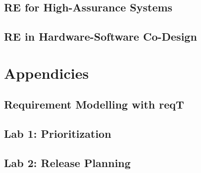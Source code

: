 \documentclass{reqengbook}
\begin{document}
\chapter{RE for High-Assurance Systems}

\chapter{RE in Hardware-Software Co-Design}

\part{Appendicies}\appendix

\chapter{Requirement Modelling with reqT}

\chapter{Lab 1: Prioritization}

\chapter{Lab 2: Release Planning}
\end{document}
